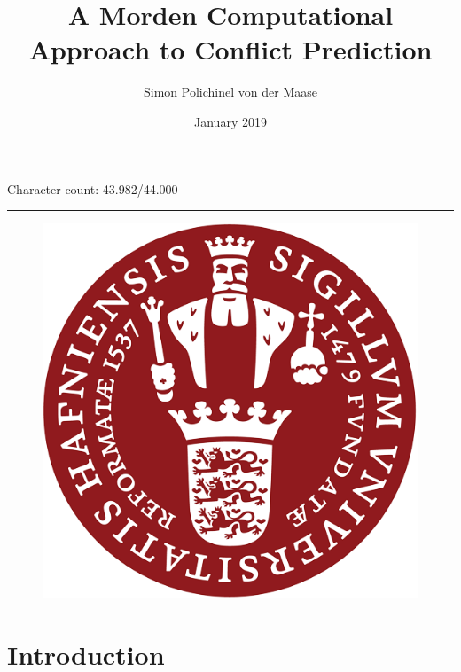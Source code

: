 \documentclass[a4paper]{article}
\title{A Morden Computational Approach to Conflict Prediction}
\author{Simon Polichinel von der Maase}
\date{January 2019}
\begin{document}
	\begin{titlepage}
		\maketitle
		Character count: 43.982/44.000\\
		\noindent\rule{\linewidth}{0.4pt}
		\begin{figure}[h]
			\centering
			\includegraphics[scale=0.32]{KU_logo.png}
		\end{figure}
		\thispagestyle{empty} %
	\end{titlepage}
    \tableofcontents
\pagebreak

\begin{abstract}
\end{abstract}
\pagebreak

\section{Introduction}

\end{document}

